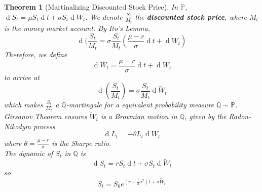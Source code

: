 \documentclass[12pt]{article}
\newtheorem{theorem}{Theorem}[section]
\theoremstyle{definition}
\DeclareMathOperator{\diff}{d}
\begin{document}
\begin{theorem}[Martinalizing Discounted Stock Price]
\normalfont In $\mathbb{P}$, $\diff S_t = \mu S_t\diff t + \sigma S_t\diff W_t$. We denote $\frac{S_t}{M_t}$ the \textbf{discounted stock price}, where $M_t$ is the money market account. By Ito's Lemma,
\[
\diff(\frac{S_t}{M_t}=\sigma\frac{S_t}{M_t}(\frac{\mu-r}{\sigma}\diff t + \diff W_t)
\]
Therefore, we define
\[
\diff \tilde{W}_t=\frac{\mu-r}{\sigma}\diff t+\diff W_t
\]
to arrive at 
\[
\diff (\frac{S_t}{M_t})=\sigma\frac{S_t}{M_t}\diff \tilde{W}_t
\]
which makes $\frac{S_t}{M_t}$ a $\mathbb{Q}$-martingale for a equivalent probability measure $\mathbb{Q}\sim \mathbb{P}$.\\
Girsanov Theorem ensures $\tilde{W}_t$ is a Brownian motion in $\mathbb{Q}$, given by the Radon-Nikodym process
\[
\diff L_t = -\theta L_t\diff W_t
\]
where $\theta=\frac{\mu-r}{\sigma}$ is the Sharpe ratio.\\
The dynamic of $S_t$ in $\mathbb{Q}$ is
\[
\diff S_t = rS_t\diff t +\sigma S_t\diff \tilde{W}_t
\]
so
\[
S_t=S_0e^{(r-\frac{1}{2}\sigma^2)t+\sigma\tilde{W}_t}
\]
\end{theorem}
\end{document}
